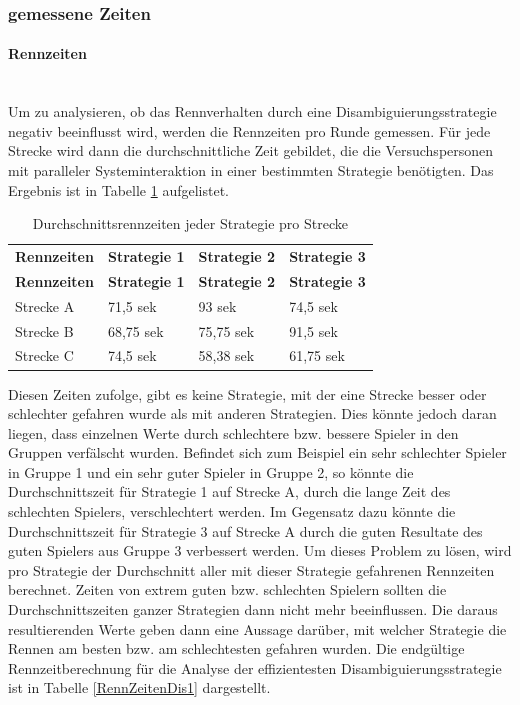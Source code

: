 \documentclass[12pt,a4paper]{scrartcl}
\begin{document}
\subsubsection{gemessene Zeiten}
\label{messwerte1}
\paragraph{Rennzeiten} 
~\\
Um zu analysieren, ob das Rennverhalten durch eine Disambiguierungsstrategie negativ beeinflusst wird, werden die Rennzeiten pro Runde gemessen. Für jede Strecke wird dann die durchschnittliche Zeit gebildet, die die Versuchspersonen mit paralleler Systeminteraktion in einer bestimmten Strategie benötigten. Das Ergebnis ist in Tabelle \ref{RZ3SV1} aufgelistet.

\begin{longtable}{p{3cm}p{3cm}p{3cm}p{3cm} }
	\label{RZ3SV1}\\
	\caption[Durchschnittsrennzeiten jeder Strategie pro Strecke]{Durchschnittsrennzeiten jeder Strategie pro Strecke}\\
	\hline
	\textbf{Rennzeiten}&\textbf{Strategie 1}&\textbf{Strategie 2} &\textbf{Strategie 3}\\
	\hline
	\endfirsthead
	\hline
	\textbf{Rennzeiten}&\textbf{Strategie 1}&\textbf{Strategie 2} &\textbf{Strategie 3}\\
	\hline
	\endhead
Strecke A & 71,5 sek & 93 sek & 74,5 sek \\
Strecke B & 68,75 sek & 75,75 sek & 91,5 sek \\
Strecke C & 74,5 sek & 58,38 sek & 61,75 sek \\
\hline
\end{longtable}

Diesen Zeiten zufolge, gibt es keine Strategie, mit der eine Strecke besser oder schlechter gefahren wurde als mit anderen Strategien. 
Dies könnte jedoch daran liegen, dass einzelnen Werte durch schlechtere bzw. bessere Spieler in den Gruppen verfälscht wurden.
Befindet sich zum Beispiel ein sehr schlechter Spieler in Gruppe 1 und ein sehr guter Spieler in Gruppe 2, so könnte die Durchschnittszeit für Strategie 1 auf Strecke A, durch die lange Zeit des schlechten Spielers, verschlechtert werden. Im Gegensatz dazu könnte die Durchschnittszeit für Strategie 3 auf Strecke A durch die guten Resultate des guten Spielers aus Gruppe 3 verbessert werden. Um dieses Problem zu lösen, wird pro Strategie der Durchschnitt aller mit dieser Strategie gefahrenen Rennzeiten berechnet. Zeiten von extrem guten bzw. schlechten Spielern sollten die Durchschnittszeiten ganzer Strategien dann nicht mehr beeinflussen. Die daraus resultierenden Werte geben dann eine Aussage darüber, mit welcher Strategie die Rennen am besten bzw. am schlechtesten gefahren wurden. 
Die endgültige Rennzeitberechnung für die Analyse der effizientesten Disambiguierungsstrategie ist in Tabelle \ref{RennZeitenDis1} dargestellt.
\end{document}
